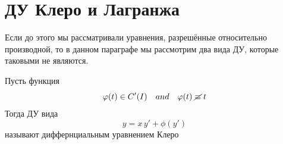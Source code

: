 \section{ДУ Клеро и Лагранжа}

\begin{Note}
    Если до этого мы рассматривали уравнения, разрешённые относительно производной, то в данном параграфе мы рассмотрим два вида ДУ, которые таковыми не являются.
\end{Note}

\begin{Def}
    Пусть функция 
    \[
        \varphi(t) \in C'(I) \quad and \quad \varphi(t)\; \cancel{\equiv}\; t
    \]
    Тогда ДУ вида 
    \[
        y = x\,y' + \phi(y')
    \] 
    называют диффернциальным уравнением Клеро
\end{Def}

